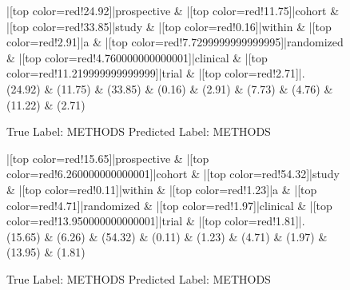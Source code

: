 \documentclass[a4paper, landscape]{article}
\begin{document}
\begin{figure}
\begin{center}
\begin{dependency}
\begin{deptext}
|[top color=red!24.92]|prospective \& |[top color=red!11.75]|cohort \& |[top color=red!33.85]|study \& |[top color=red!0.16]|within \& |[top color=red!2.91]|a \& |[top color=red!7.7299999999999995]|randomized \& |[top color=red!4.760000000000001]|clinical \& |[top color=red!11.219999999999999]|trial \& |[top color=red!2.71]|.\\
(24.92) \& (11.75) \& (33.85) \& (0.16) \& (2.91) \& (7.73) \& (4.76) \& (11.22) \& (2.71)\\
\end{deptext}
\end{dependency}
\end{center}
\caption{True Label: METHODS Predicted Label: METHODS}
\end{figure}
\clearpage
\begin{figure}
\begin{center}
\begin{dependency}
\begin{deptext}
|[top color=red!15.65]|prospective \& |[top color=red!6.260000000000001]|cohort \& |[top color=red!54.32]|study \& |[top color=red!0.11]|within \& |[top color=red!1.23]|a \& |[top color=red!4.71]|randomized \& |[top color=red!1.97]|clinical \& |[top color=red!13.950000000000001]|trial \& |[top color=red!1.81]|.\\
(15.65) \& (6.26) \& (54.32) \& (0.11) \& (1.23) \& (4.71) \& (1.97) \& (13.95) \& (1.81)\\
\end{deptext}
\end{dependency}
\end{center}
\caption{True Label: METHODS Predicted Label: METHODS}
\end{figure}
\end{document}
